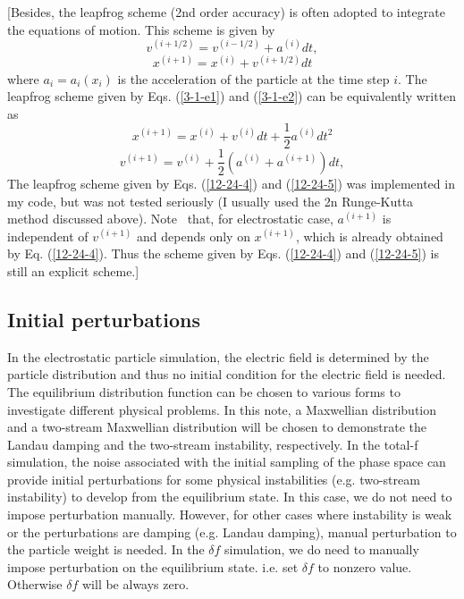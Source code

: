 \documentclass{article}
\begin{document}
[Besides, the leapfrog scheme (2nd order accuracy) is often adopted to
integrate the equations of motion. This scheme is given by
\begin{equation}
  \label{3-1-e2} v^{(i + 1 / 2)} = v^{(i - 1 / 2)} + a^{(i)} d t,
\end{equation}
\begin{equation}
  \label{3-1-e1} x^{(i + 1)} = x^{(i)} + v_{}^{(i + 1 / 2)} d t
\end{equation}
where $a_i = a_i (x_i)$ is the acceleration of the particle at the time step
$i$. The leapfrog scheme given by Eqs. (\ref{3-1-e1}) and (\ref{3-1-e2}) can
be equivalently written as{\cite{artcompsci}}
\begin{equation}
  \label{12-24-4} x^{(i + 1)} = x^{(i)} + v^{(i)} d t + \frac{1}{2} a^{(i)} d
  t^2
\end{equation}
\begin{equation}
  \label{12-24-5} v^{(i + 1)} = v^{(i)} + \frac{1}{2} (a^{(i)} + a^{(i + 1)})
  d t,
\end{equation}
The leapfrog scheme given by Eqs. (\ref{12-24-4}) and (\ref{12-24-5}) was
implemented in my code, but was not tested seriously (I usually used the 2n
Runge-Kutta method discussed above). Note \ that, for electrostatic case,
$a^{(i + 1)}$ is independent of $v^{(i + 1)}$ and depends only on $x^{(i +
1)}$, which is already obtained by Eq. (\ref{12-24-4}). Thus the scheme given
by Eqs. (\ref{12-24-4}) and (\ref{12-24-5}) is still an explicit scheme.]

\subsection{Initial perturbations}

In the electrostatic particle simulation, the electric field is determined by
the particle distribution and thus no initial condition for the electric field
is needed. The equilibrium distribution function can be chosen to various
forms to investigate different physical problems. In this note, a Maxwellian
distribution and a two-stream Maxwellian distribution will be chosen to
demonstrate the Landau damping and the two-stream instability, respectively.
In the total-f simulation, the noise associated with the initial sampling of
the phase space can provide initial perturbations for some physical
instabilities (e.g. two-stream instability) to develop from the equilibrium
state. In this case, we do not need to impose perturbation manually. However,
for other cases where instability is weak or the perturbations are damping
(e.g. Landau damping), manual perturbation to the particle weight is needed.
In the $\delta f$ simulation, we do need to manually impose perturbation on
the equilibrium state. i.e. set $\delta f$ to nonzero value. Otherwise $\delta
f$ will be always zero.
\end{document}
